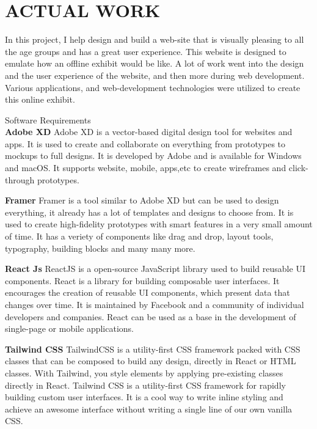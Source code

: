 \chapter{ACTUAL WORK} %
\label{ChapterActualWork} %


In this project, I help design and build a web-site that is visually pleasing to all the age groups and has a great user experience. This website is designed to emulate how an offline exhibit would be like. A lot of work went into the design and the user experience of the website, and then more during web development. Various applications, and web-development technologies were utilized to create this online exhibit. 


Software Requirements
\\
\textbf{Adobe XD}
Adobe XD is a vector-based digital design tool for websites and apps. It is used to  create and collaborate on everything from prototypes to mockups to full designs. It is developed by Adobe and is available for Windows and macOS. It supports website, mobile, apps,etc to create wireframes and click-through prototypes.

\textbf{Framer}
Framer is a tool similar to Adobe XD but can be used to design everything, it already has a lot of templates and designs to choose from. It is used to create high-fidelity prototypes with smart features in a very small amount of time. It has a veriety of components like drag and drop, layout tools, typography, building blocks and many many more.

\textbf{React Js}
ReactJS is a open-source JavaScript library used to build reusable UI components. React is a library for building composable user interfaces. It encourages the creation of reusable UI components, which present data that changes over time. It is maintained by Facebook and a community of individual developers and companies. React can be used as a base in the development of single-page or mobile applications.


\textbf{Tailwind CSS}
TailwindCSS is a utility-first CSS framework packed with CSS classes that can be composed to build any design, directly in React or HTML classes. With Tailwind, you style elements by applying pre-existing classes directly in React. Tailwind CSS is a utility-first CSS framework for rapidly building custom user interfaces. It is a cool way to write inline styling and achieve an awesome interface without writing a single line of our own vanilla CSS.


